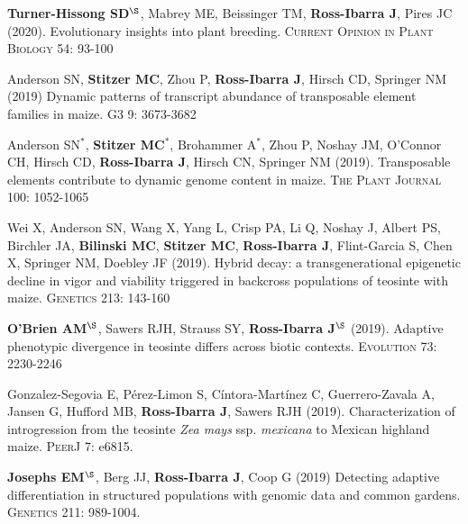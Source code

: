 \documentclass[letterpaper,10pt]{article}
\begin{document}
\begin{etaremune}
\item \textbf{Turner-Hissong SD}$^\S$, Mabrey ME, Beissinger TM, \textbf{Ross-Ibarra J}, Pires JC (2020). Evolutionary insights into plant breeding. \textsc{Current Opinion in Plant Biology} 54: 93-100

\item  Anderson SN, \textbf{Stitzer MC},  Zhou P, \textbf{Ross-Ibarra J}, Hirsch CD, Springer NM (2019) Dynamic patterns of transcript abundance of transposable element families in maize. \textsc{G3} 9: 3673-3682

\item  Anderson SN$^*$, \textbf{Stitzer MC}$^*$,  Brohammer A$^*$, Zhou P, Noshay JM,  O'Connor CH, Hirsch CD, \textbf{Ross-Ibarra J}, Hirsch CN, Springer NM (2019). Transposable elements contribute to dynamic genome content in maize. \textsc{The Plant Journal} 100: 1052-1065

\item Wei X,  Anderson SN,  Wang X,  Yang L, Crisp PA,  Li Q,  Noshay J, Albert PS, Birchler JA,  \textbf{Bilinski MC}, \textbf{Stitzer MC}, \textbf{Ross-Ibarra J},  Flint-Garcia S,  Chen X,  Springer NM, Doebley JF (2019). Hybrid decay: a transgenerational epigenetic decline in vigor and viability triggered in backcross populations of teosinte with maize. \textsc{Genetics} 213: 143-160

\item \textbf{O'Brien AM}$^\S$, Sawers RJH, Strauss SY, \textbf{Ross-Ibarra J}$^\S$ (2019). Adaptive phenotypic divergence in teosinte differs across biotic contexts. \textsc{Evolution} 73: 2230-2246

\item  Gonzalez-Segovia E,  P\'erez-Limon S,  C\'intora-Mart\'inez C,  Guerrero-Zavala A,  Jansen G,  Hufford MB, \textbf{Ross-Ibarra J}, Sawers RJH (2019). Characterization of introgression from the teosinte \textit{Zea mays} ssp. \textit{mexicana} to Mexican highland maize. \textsc{PeerJ} 7: e6815. %

\item \textbf{Josephs EM}$^\S$, Berg JJ, \textbf{Ross-Ibarra J}, Coop G (2019) Detecting adaptive differentiation in structured populations with genomic data and common gardens. \textsc{Genetics} 211: 989-1004.


\end{etaremune}
\end{document}

